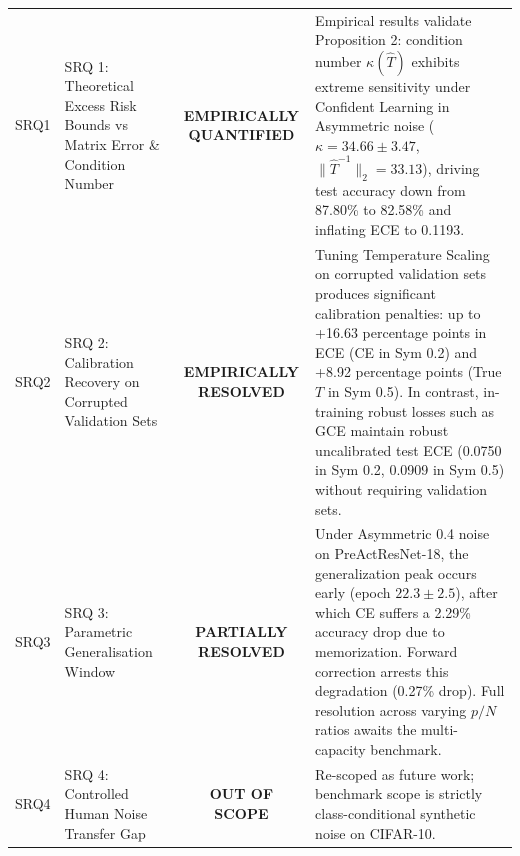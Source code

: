 \begin{table}[t]
\begin{tabular}{lp{5.5cm}cp{7.5cm}}
SRQ1 & SRQ 1: Theoretical Excess Risk Bounds vs Matrix Error \& Condition Number & \textbf{EMPIRICALLY QUANTIFIED} & Empirical results validate Proposition 2: condition number $\kappa(\hat{T})$ exhibits extreme sensitivity under Confident Learning in Asymmetric noise ($\kappa = 34.66 \pm 3.47$, $\|\hat{T}^{-1}\|_2 = 33.13$), driving test accuracy down from 87.80\% to 82.58\% and inflating ECE to 0.1193. \\
SRQ2 & SRQ 2: Calibration Recovery on Corrupted Validation Sets & \textbf{EMPIRICALLY RESOLVED} & Tuning Temperature Scaling on corrupted validation sets produces significant calibration penalties: up to +16.63 percentage points in ECE (CE in Sym 0.2) and +8.92 percentage points (True $T$ in Sym 0.5). In contrast, in-training robust losses such as GCE maintain robust uncalibrated test ECE (0.0750 in Sym 0.2, 0.0909 in Sym 0.5) without requiring validation sets. \\
SRQ3 & SRQ 3: Parametric Generalisation Window & \textbf{PARTIALLY RESOLVED} & Under Asymmetric 0.4 noise on PreActResNet-18, the generalization peak occurs early (epoch $22.3 \pm 2.5$), after which CE suffers a 2.29\% accuracy drop due to memorization. Forward correction arrests this degradation (0.27\% drop). Full resolution across varying $p/N$ ratios awaits the multi-capacity benchmark. \\
SRQ4 & SRQ 4: Controlled Human Noise Transfer Gap & \textbf{OUT OF SCOPE} & Re-scoped as future work; benchmark scope is strictly class-conditional synthetic noise on CIFAR-10. \\
\hline
\end{tabular}
\end{table}
